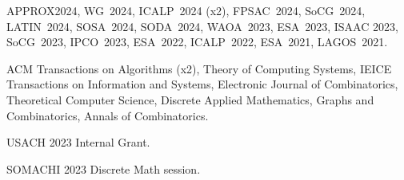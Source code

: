 

APPROX2024, WG~2024, ICALP~2024 (x2), FPSAC~2024, SoCG~2024, LATIN~2024, SOSA~2024, SODA~2024, WAOA~2023, ESA~2023, ISAAC 2023, SoCG~2023, IPCO~2023, ESA~2022, ICALP~2022, ESA~2021, LAGOS~2021. 


ACM Transactions on Algorithms (x2), Theory of Computing Systems, IEICE Transactions on Information and Systems, Electronic Journal of Combinatorics, Theoretical Computer Science, Discrete Applied Mathematics, Graphs and Combinatorics, Annals of Combinatorics.


USACH 2023 Internal Grant.


SOMACHI 2023 Discrete Math session.


 
